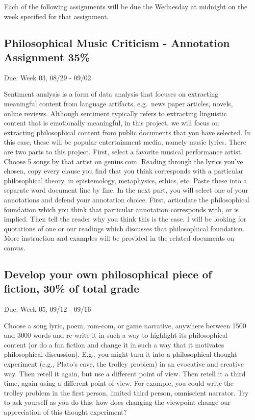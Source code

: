 \documentclass[11pt,]{article}
\begin{document}
Each of the following assignments will be due the Wednesday at midnight
on the week specified for that assignment.

\subsection{Philosophical Music Criticism - Annotation Assignment
35\%}\label{philosophical-music-criticism---annotation-assignment-35}

Due: Week 03, 08/29 - 09/02

Sentiment analysis is a form of data analysis that focuses on extracting
meaningful content from language artifacts, e.g.~news paper articles,
novels, online reviews. Although sentiment typically refers to
extracting linguistic content that is emotionally meaningful, in this
project, we will focus on extracting philosophical content from public
documents that you have selected. In this case, these will be popular
entertainment media, namely music lyrics. There are two parts to this
project. First, select a favorite musical performance artist. Choose 5
songs by that artist on genius.com. Reading through the lyrics you've
chosen, copy every clause you find that you think corresponds with a
particular philosophical theory, in epistemology, metaphysics, ethics,
etc. Paste these into a separate word document line by line. In the next
part, you will select one of your annotations and defend your annotation
choice. First, articulate the philosophical foundation which you think
that particular annotation corresponds with, or is implied. Then tell
the reader why you think this is the case. I will be looking for
quotations of one or our readings which discusses that philosophical
foundation. More instruction and examples will be provided in the
related documents on canvas.

\subsection{Develop your own philosophical piece of fiction, 30\% of
total
grade}\label{develop-your-own-philosophical-piece-of-fiction-30-of-total-grade}

Due: Week 05, 09/12 - 09/16

Choose a song lyric, poem, rom-com, or game narrative, anywhere between
1500 and 3000 words and re-write it in such a way to highlight its
philosophical content (or do a fan fiction and change it in such a way
that it motivates philosophical discussion). E.g., you might turn it
into a philosophical thought experiment (e.g., Plato's cave, the trolley
problem) in an evocative and creative way. Then retell it again, but use
a different point of view. Then retell it a third time, again using a
different point of view. For example, you could write the trolley
problem in the first person, limited third person, omniscient narrator.
Try to ask yourself as you do this: how does changing the viewpoint
change our appreciation of this thought experiment?
\end{document}
